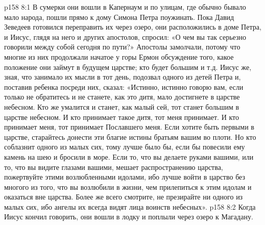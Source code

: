 \vs p158 8:1 В сумерки они вошли в Капернаум и по улицам, где обычно бывало мало народа, пошли прямо к дому Симона Петра поужинать. Пока Давид Зеведеев готовился переправить их через озеро, они расположились в доме Петра, и Иисус, глядя на него и других апостолов, спросил: «О чем вы так серьезно говорили между собой сегодня по пути?» Апостолы замолчали, потому что многие из них продолжали начатое у горы Ермон обсуждение того, какое положение они займут в будущем царстве; кто будет большим и т.д. Иисус же, зная, что занимало их мысли в тот день, подозвал одного из детей Петра и, поставив ребенка посреди них, сказал: «Истинно, истинно говорю вам, если только не обратитесь и не станете, как это дитя, мало достигнете в царстве небесном. Кто же умалится и станет, как малый сей, тот станет большим в царстве небесном. И кто принимает такое дитя, тот меня принимает. И кто принимает меня, тот принимает Пославшего меня. Если хотите быть первыми в царстве, старайтесь донести эти благие истины братьям вашим во плоти. Но кто соблазнит одного из малых сих, тому лучше было бы, если бы повесили ему камень на шею и бросили в море. Если то, что вы делаете руками вашими, или то, что вы видите глазами вашими, мешает распространению царства, пожертвуйте этими возлюбленными идолами, ибо лучше войти в царство без многого из того, что вы возлюбили в жизни, чем прилепиться к этим идолам и оказаться вне царства. Более же всего смотрите, не презирайте ни одного из малых сих, ибо ангелы их всегда видят лица воинств небесных».
\vs p158 8:2 Когда Иисус кончил говорить, они вошли в лодку и поплыли через озеро к Магадану.
